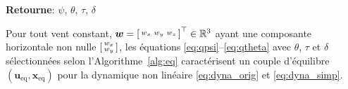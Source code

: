 \begin{algorithm}
\begin{algorithmic}[1]
    \end{algorithmic}
    \hspace*{.1cm} \textbf{Retourne}:  $\psi$, $\theta$, $\tau$, $\delta$
    \end{algorithm}


    \begin{theorem}\label{thm:eqs}
    Pour tout vent constant, $\boldsymbol{w} =\left[ \begin{smallmatrix}w_x & w_y & w_z \end{smallmatrix} \right]^\top \in {\mathbb R}^3$ ayant une composante horizontale non nulle $\left[ \begin{smallmatrix}w_x \\ w_y \end{smallmatrix} \right]$, les équations \eqref{eq:qpsi}--\eqref{eq:qtheta} avec $\theta$, $\tau$ et $\delta$ sélectionnées selon l'Algorithme~\ref{alg:eq} caractérisent un couple d'équilibre $(\boldsymbol{u}_{\text{eq}}, \boldsymbol{x}_{\text{eq}})$ pour la dynamique non linéaire \eqref{eq:dyna_orig} et \eqref{eq:dyna_simp}.
    
    \end{theorem}
    
